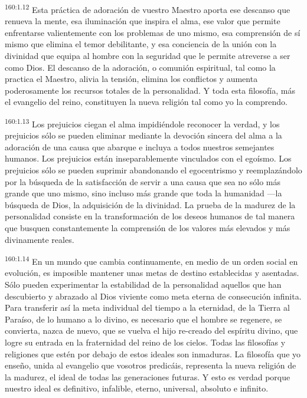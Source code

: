 \par 
\textsuperscript{160:1.12} Esta práctica de adoración de vuestro Maestro aporta ese descanso que renueva la mente, esa iluminación que inspira el alma, ese valor que permite enfrentarse valientemente con los problemas de uno mismo, esa comprensión de sí mismo que elimina el temor debilitante, y esa conciencia de la unión con la divinidad que equipa al hombre con la seguridad que le permite atreverse a ser como Dios. El descanso de la adoración, o comunión espiritual, tal como la practica el Maestro, alivia la tensión, elimina los conflictos y aumenta poderosamente los recursos totales de la personalidad. Y toda esta filosofía, más el evangelio del reino, constituyen la nueva religión tal como yo la comprendo.

\par 
\textsuperscript{160:1.13} Los prejuicios ciegan el alma impidiéndole reconocer la verdad, y los prejuicios sólo se pueden eliminar mediante la devoción sincera del alma a la adoración de una causa que abarque e incluya a todos nuestros semejantes humanos. Los prejuicios están inseparablemente vinculados con el egoísmo. Los prejuicios sólo se pueden suprimir abandonando el egocentrismo y reemplazándolo por la búsqueda de la satisfacción de servir a una causa que sea no sólo más grande que uno mismo, sino incluso más grande que toda la humanidad ---la búsqueda de Dios, la adquisición de la divinidad. La prueba de la madurez de la personalidad consiste en la transformación de los deseos humanos de tal manera que busquen constantemente la comprensión de los valores más elevados y más divinamente reales.

\par 
\textsuperscript{160:1.14} En un mundo que cambia continuamente, en medio de un orden social en evolución, es imposible mantener unas metas de destino establecidas y asentadas. Sólo pueden experimentar la estabilidad de la personalidad aquellos que han descubierto y abrazado al Dios viviente como meta eterna de consecución infinita. Para transferir así la meta individual del tiempo a la eternidad, de la Tierra al Paraíso, de lo humano a lo divino, es necesario que el hombre se regenere, se convierta, nazca de nuevo, que se vuelva el hijo re-creado del espíritu divino, que logre su entrada en la fraternidad del reino de los cielos. Todas las filosofías y religiones que estén por debajo de estos ideales son inmaduras. La filosofía que yo enseño, unida al evangelio que vosotros predicáis, representa la nueva religión de la madurez, el ideal de todas las generaciones futuras. Y esto es verdad porque nuestro ideal es definitivo, infalible, eterno, universal, absoluto e infinito.

